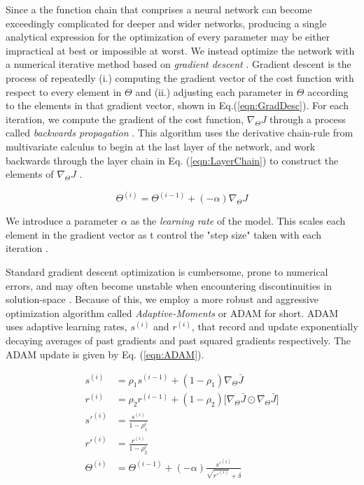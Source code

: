 \documentclass[conference,onecolumn,letterpaper]{IEEEtran}
\begin{document}
Since a the function chain that comprises a neural network can become exceedingly complicated for deeper and wider networks, producing a single analytical expression for the optimization of every parameter may be either impractical at best or impossible at worst. We instead optimize the network with a numerical iterative method based on \textit{gradient descent} \cite{Geron,Goodfellow}. Gradient descent is the process of repeatedly (i.) computing the gradient vector of the cost function with respect to every element in $\Theta$ and (ii.) adjusting each parameter in $\Theta$ according to the elements in that gradient vector, shown in Eq.(\ref{eqn:GradDesc}). For each iteration, we compute the gradient of the cost function, $\nabla_{\Theta}J$ through a process called \textit{backwards propagation} \cite{Geron}. This algorithm uses the derivative chain-rule from multivariate calculus to begin at the last layer of the network, and work backwards through the layer chain in Eq. (\ref{eqn:LayerChain}) to construct the elements of $\nabla_{\Theta}J$ \cite{Goodfellow,Virtanen}.

\begin{equation}
    \label{eqn:GradDesc}
    \Theta^{(i)} = \Theta^{(i-1)} + (-\alpha)\nabla_{\Theta}J
\end{equation}

We introduce a parameter $\alpha$ as the \textit{learning rate} of the model. This scales each element in the gradient vector as t control the "step size" taken with each iteration \cite{Geron,Goodfellow,Virtanen}.

Standard gradient descent optimization is cumbersome, prone to numerical errors, and may often become unstable when encountering discontinuities in solution-space \cite{James,Geron}. Because of this, we employ a more robust and aggressive optimization algorithm called \textit{Adaptive-Moments} or ADAM for short. ADAM uses adaptive learning rates, $s^{(i)}$ and $r^{(i)}$, that record and update exponentially decaying averages of past gradients and past squared gradients respectively. The ADAM update is given by Eq. (\ref{eqn:ADAM}).

\begin{equation}
    \label{eqn:ADAM}
        \begin{split}
        s^{(i)} &= \rho_1 s^{(i-1)} + (1 - \rho_1) \nabla_{\Theta} \bar{J}  \\
        r^{(i)} &= \rho_2 r^{(i-1)} + (1 - \rho_2) \Big[ \nabla_{\Theta} \bar{J} \odot \nabla_{\Theta} \bar{J} \Big]  \\
        s'^{(i)} &= \frac{s^{(i)}}{1-\rho_1^i} \\
        r'^{(i)} &= \frac{r^{(i)}}{1-\rho_2^i} \\
        \Theta^{(i)} &= \Theta^{(i-1)} + (-\alpha)\frac{s'^{(i)}}{\sqrt{r'^{(i)}}+\delta} \\
        \end{split}
\end{equation}
\end{document}
